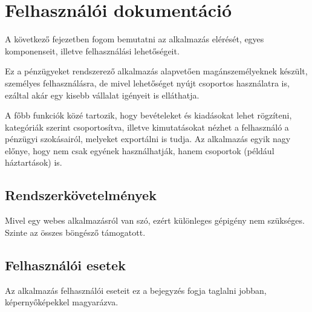 \chapter{Felhasználói dokumentáció}
\label{ch:user}

A következő fejezetben fogom bemutatni az alkalmazás elérését, egyes komponenseit, illetve felhasználási lehetőségeit. 

Ez a pénzügyeket rendszerező alkalmazás alapvetően magánszemélyeknek készült, személyes felhasználásra, de mivel lehetőséget nyújt csoportos használatra is, ezáltal akár egy kisebb vállalat igényeit is elláthatja.

A főbb funkciók közé tartozik, hogy bevételeket és kiadásokat lehet rögzíteni, kategóriák szerint csoportosítva, illetve kimutatásokat nézhet a felhasználó a pénzügyi szokásairól, melyeket exportálni is tudja. Az alkalmazás egyik nagy előnye, hogy nem csak egyének használhatják, hanem csoportok (például háztartások) is.


\section{Rendszerkövetelmények}

Mivel egy webes alkalmazásról van szó, ezért különleges gépigény nem szükséges. Szinte az összes böngésző támogatott.

\section{Felhasználói esetek}
Az alkalmazás felhasználói eseteit ez a bejegyzés fogja taglalni jobban, képernyőképekkel magyarázva.

